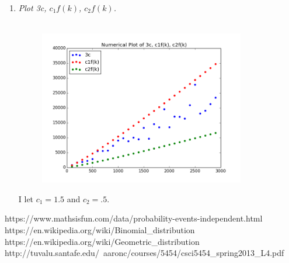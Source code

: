 \documentclass[12pt]{article}
\begin{document}
\begin{enumerate}
\begin{enumerate}
		    \item \textit{Plot 3c, $c_1f(k)$, $c_2f(k)$.}\\
		    \\
		    \begin{figure}[H]
		    \centering
			\includegraphics[width=9cm]{q3_3d.png}
			\end{figure}
		    I let $c_1 = 1.5$ and $c_2 = .5$.
		\end{enumerate}

\end{enumerate}

\newpage
\begin{thebibliography}{10}
	 https://www.mathsisfun.com/data/probability-events-independent.html
	 https://en.wikipedia.org/wiki/Binomial\_distribution
	 https://en.wikipedia.org/wiki/Geometric\_distribution
     http://tuvalu.santafe.edu/~aaronc/courses/5454/csci5454\_spring2013\_L4.pdf
\end{thebibliography}
\end{document}
